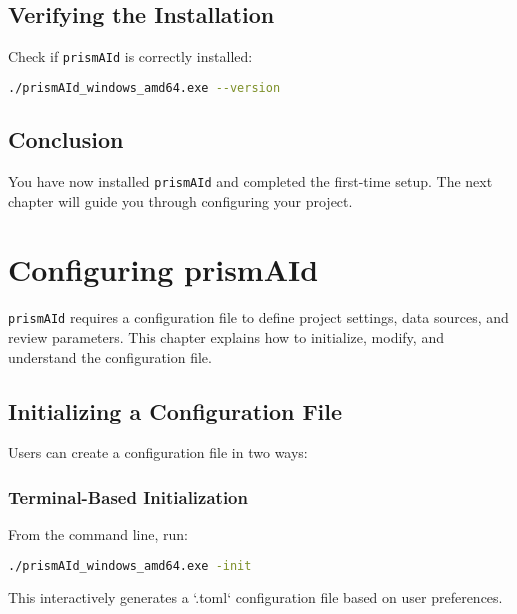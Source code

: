 \section{Verifying the Installation}

Check if \texttt{prismAId} is correctly installed:

\begin{commandbox}
\begin{lstlisting}[language=Bash]
./prismAId_windows_amd64.exe --version
\end{lstlisting}
\end{commandbox}

\section{Conclusion}

You have now installed \texttt{prismAId} and completed the first-time setup. The next chapter will guide you through configuring your project.


\chapter{Configuring prismAId} 
\label{chap:config}

\texttt{prismAId} requires a configuration file to define project settings, data sources, and review parameters. This chapter explains how to initialize, modify, and understand the configuration file.

\section{Initializing a Configuration File}

Users can create a configuration file in two ways:

\subsection{Terminal-Based Initialization}

From the command line, run:

\begin{commandbox}
\begin{lstlisting}[language=Bash]
./prismAId_windows_amd64.exe -init
\end{lstlisting}
\end{commandbox}
This interactively generates a `.toml` configuration file based on user preferences.

